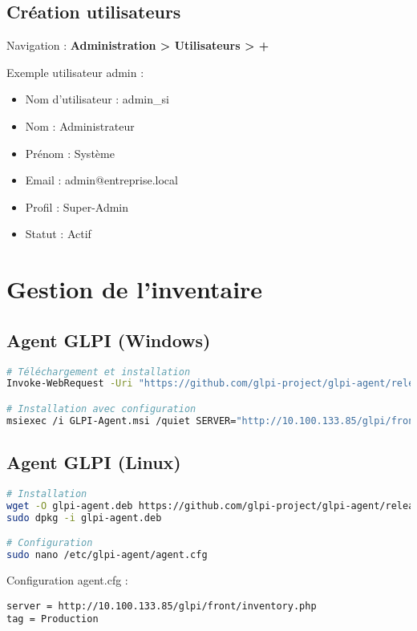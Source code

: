 \documentclass[12pt,a4paper]{article}
\begin{document}
\subsection{Création utilisateurs}
Navigation : \textbf{Administration > Utilisateurs > +}

Exemple utilisateur admin :
\begin{itemize}
    \item Nom d'utilisateur : admin\_si
    \item Nom : Administrateur
    \item Prénom : Système
    \item Email : admin@entreprise.local
    \item Profil : Super-Admin
    \item Statut : Actif
\end{itemize}

\section{Gestion de l'inventaire}

\subsection{Agent GLPI (Windows)}
\begin{lstlisting}[language=bash]
# Téléchargement et installation
Invoke-WebRequest -Uri "https://github.com/glpi-project/glpi-agent/releases/download/1.7.3/GLPI-Agent-1.7.3-x64.msi" -OutFile "GLPI-Agent.msi"

# Installation avec configuration
msiexec /i GLPI-Agent.msi /quiet SERVER="http://10.100.133.85/glpi/front/inventory.php" TAG="Production"
\end{lstlisting}

\subsection{Agent GLPI (Linux)}
\begin{lstlisting}[language=bash]
# Installation
wget -O glpi-agent.deb https://github.com/glpi-project/glpi-agent/releases/download/1.7.3/glpi-agent_1.7.3-1_amd64.deb
sudo dpkg -i glpi-agent.deb

# Configuration
sudo nano /etc/glpi-agent/agent.cfg
\end{lstlisting}

Configuration agent.cfg :
\begin{lstlisting}
server = http://10.100.133.85/glpi/front/inventory.php
tag = Production
\end{lstlisting}
\end{document}
